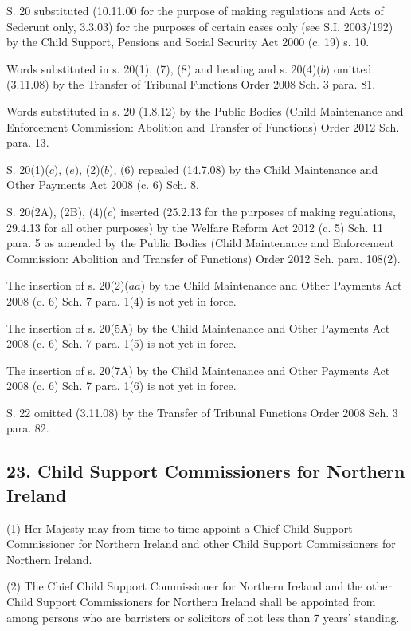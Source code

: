 \documentclass[a4paper]{article}
\begin{document}
{{%

S. 20 substituted (10.11.00 for the purpose of making regulations and Acts of Sederunt only, 3.3.03) for the purposes of certain cases only (see S.I. 2003/192) by the Child Support, Pensions and Social Security Act 2000 (c. 19) s. 10. 

Words substituted in s. 20(1), (7), (8) and heading and s. 20(4)($b$) omitted (3.11.08) by the Transfer of Tribunal Functions Order 2008 Sch. 3 para. 81. 

Words substituted in s. 20 (1.8.12) by the Public Bodies (Child Maintenance and Enforcement Commission: Abolition and Transfer of Functions) Order 2012 Sch. para.
13.

S. 20(1)($c$), ($e$), (2)($b$), (6) repealed (14.7.08) by the Child Maintenance and Other Payments
Act 2008 (c. 6) Sch. 8. 

S. 20(2A), (2B), (4)($c$) inserted (25.2.13 for the purposes of making regulations, 29.4.13 for all other purposes) by the Welfare Reform Act 2012 (c. 5) Sch. 11 para. 5 as amended by the Public Bodies (Child Maintenance and Enforcement Commission: Abolition and Transfer of Functions) Order 2012 Sch. para. 108(2).

The insertion of s. 20(2)($aa$) by the Child Maintenance and Other Payments Act 2008 (c. 6) Sch. 7 para. 1(4) is not yet in force.

The insertion of s. 20(5A) by the Child Maintenance and Other Payments Act 2008 (c. 6) Sch. 7 para. 1(5) is not yet in force.

The insertion of s. 20(7A) by the Child Maintenance and Other Payments Act 2008 (c. 6) Sch. 7 para. 1(6) is not yet in force.

\medskip

S. 22 omitted (3.11.08) by the Transfer of Tribunal Functions Order 2008 Sch. 3 para. 82.

}
}

\subsection{23. Child Support Commissioners for Northern Ireland}

(1) Her Majesty may from time to time appoint a Chief Child Support Commissioner for Northern Ireland and other Child Support Commissioners for Northern Ireland.

(2)
The Chief Child Support Commissioner for Northern Ireland and the other Child Support Commissioners for Northern Ireland shall be appointed from among persons who are barristers or solicitors of not less than 7 years’ standing.
\end{document}
